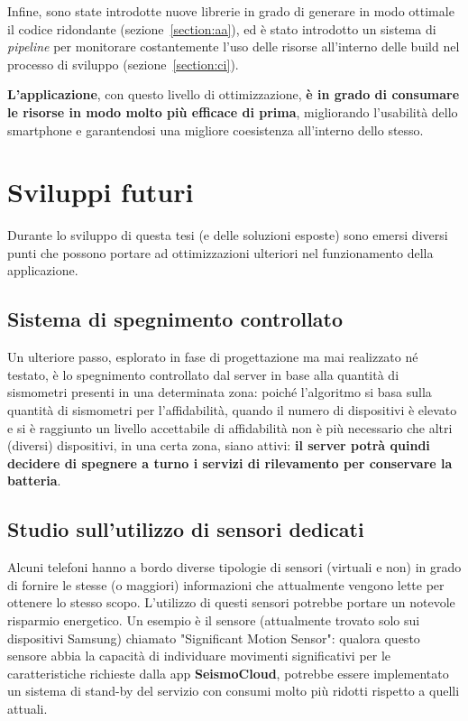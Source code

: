 \documentclass[a4paper,10pt]{memoir}
\begin{document}
\medskip

Infine, sono state introdotte nuove librerie in grado di generare in modo ottimale il codice ridondante (sezione~\ref{section:aa}), ed è stato introdotto un sistema di \textit{pipeline} per monitorare costantemente l'uso delle risorse all'interno delle build nel processo di sviluppo (sezione~\ref{section:ci}).

\vspace*{1cm}

\textbf{L'applicazione}, con questo livello di ottimizzazione, \textbf{è in grado di consumare le risorse in modo molto più efficace di prima}, migliorando l'usabilità dello smartphone e garantendosi una migliore coesistenza all'interno dello stesso.

\clearpage

\section{Sviluppi futuri}

Durante lo sviluppo di questa tesi (e delle soluzioni esposte) sono emersi diversi punti che possono portare ad ottimizzazioni ulteriori nel funzionamento della applicazione.

\subsection{Sistema di spegnimento controllato}

Un ulteriore passo, esplorato in fase di progettazione ma mai realizzato né testato, è lo spegnimento controllato dal server in base alla quantità di sismometri presenti in una determinata zona: poiché l'algoritmo si basa sulla quantità di sismometri per l'affidabilità, quando il numero di dispositivi è elevato e si è raggiunto un livello accettabile di affidabilità non è più necessario che altri (diversi) dispositivi, in una certa zona, siano attivi: \textbf{il server potrà quindi decidere di spegnere a turno i servizi di rilevamento per conservare la batteria}.

\subsection{Studio sull'utilizzo di sensori dedicati}

Alcuni telefoni hanno a bordo diverse tipologie di sensori (virtuali e non) in grado di fornire le stesse (o maggiori) informazioni che attualmente vengono lette per ottenere lo stesso scopo. L'utilizzo di questi sensori potrebbe portare un notevole risparmio energetico. Un esempio è il sensore (attualmente trovato solo sui dispositivi Samsung) chiamato "Significant Motion Sensor": qualora questo sensore abbia la capacità di individuare movimenti significativi per le caratteristiche richieste dalla app \textbf{SeismoCloud}, potrebbe essere implementato un sistema di stand-by del servizio con consumi molto più ridotti rispetto a quelli attuali.
\end{document}
